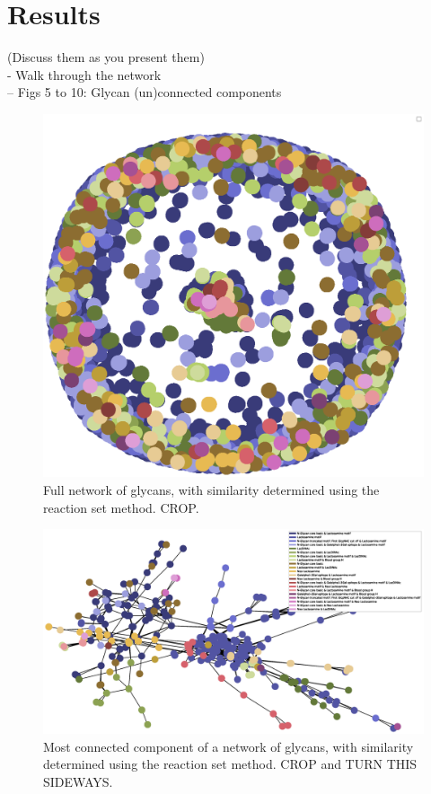 \documentclass[12pt,a4paper]{article}
\begin{document}
\newpage
\section{Results}
\label{sec:results}
(Discuss them as you present them)\\

- Walk through the network\\
-- Figs 5 to 10: Glycan (un)connected components\\

\begin{figure}[H]
\centering 
\includegraphics[scale=0.5]{threshold_87_conn_comp_1_method_set/threshold_87_full_network_method_set.eps} 
\caption{Full network of glycans, with similarity determined using the reaction set method. CROP.}
\label{fig:threshold_87_full_network_method_set}
\end{figure}

\begin{figure}
\centering 
\includegraphics[scale=0.5]{threshold_87_conn_comp_1_method_set/threshold_87_conn_comp_1_method_set.eps} 
\caption{Most connected component of a network of glycans, with similarity determined using the reaction set method. CROP and TURN THIS SIDEWAYS.}
\label{fig:threshold_87_conn_comp_1_method_set}
\end{figure}
\clearpage
\end{document}
